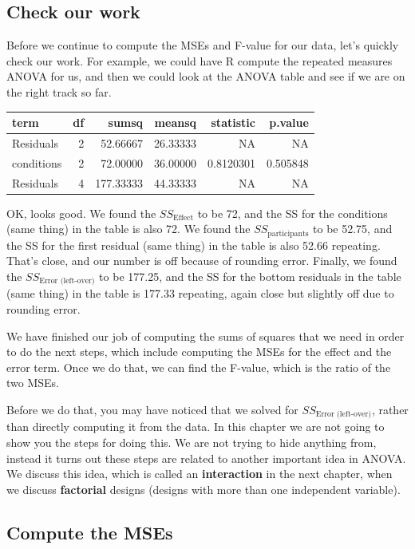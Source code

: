 \documentclass[
]{book}
\begin{document}
\subsection{Check our work}\label{check-our-work}

Before we continue to compute the MSEs and F-value for our data, let's quickly check our work. For example, we could have R compute the repeated measures ANOVA for us, and then we could look at the ANOVA table and see if we are on the right track so far.

\begin{tabular}[t]{l|r|r|r|r|r}
\hline
term & df & sumsq & meansq & statistic & p.value\\
\hline
Residuals & 2 & 52.66667 & 26.33333 & NA & NA\\
\hline
conditions & 2 & 72.00000 & 36.00000 & 0.8120301 & 0.505848\\
\hline
Residuals & 4 & 177.33333 & 44.33333 & NA & NA\\
\hline
\end{tabular}

OK, looks good. We found the \(SS_\text{Effect}\) to be 72, and the SS for the conditions (same thing) in the table is also 72. We found the \(SS_\text{participants}\) to be 52.75, and the SS for the first residual (same thing) in the table is also 52.66 repeating. That's close, and our number is off because of rounding error. Finally, we found the \(SS_\text{Error (left-over)}\) to be 177.25, and the SS for the bottom residuals in the table (same thing) in the table is 177.33 repeating, again close but slightly off due to rounding error.

We have finished our job of computing the sums of squares that we need in order to do the next steps, which include computing the MSEs for the effect and the error term. Once we do that, we can find the F-value, which is the ratio of the two MSEs.

Before we do that, you may have noticed that we solved for \(SS_\text{Error (left-over)}\), rather than directly computing it from the data. In this chapter we are not going to show you the steps for doing this. We are not trying to hide anything from, instead it turns out these steps are related to another important idea in ANOVA. We discuss this idea, which is called an \textbf{interaction} in the next chapter, when we discuss \textbf{factorial} designs (designs with more than one independent variable).

\subsection{Compute the MSEs}\label{compute-the-mses}
\end{document}
